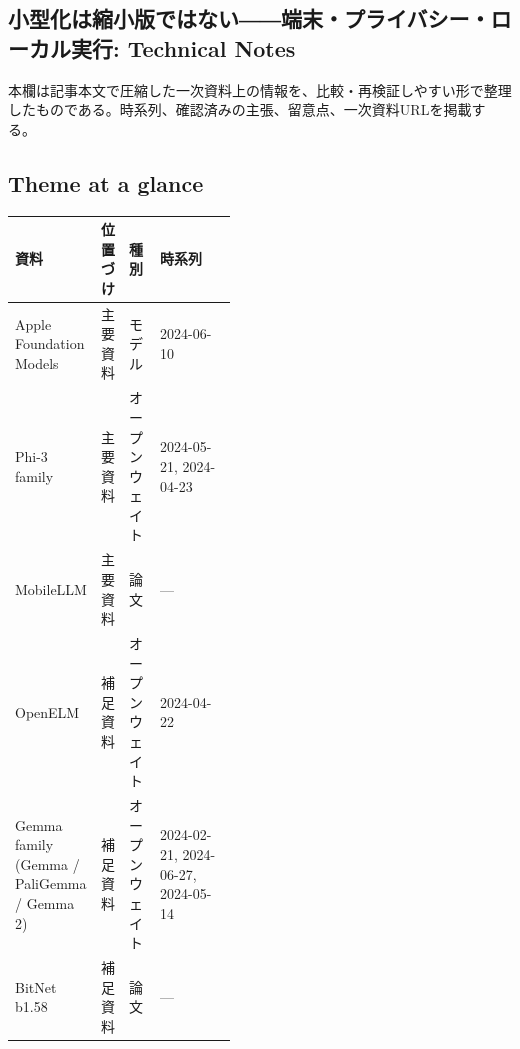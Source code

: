 \subsection*{小型化は縮小版ではない――端末・プライバシー・ローカル実行: Technical Notes}
本欄は記事本文で圧縮した一次資料上の情報を、比較・再検証しやすい形で整理したものである。時系列、確認済みの主張、留意点、一次資料URLを掲載する。
\smallskip
{}\par
\medskip
\subsection*{Theme at a glance}
\begin{center}
\footnotesize
\begin{tabularx}{\linewidth}{@{}p{0.20\linewidth}p{0.10\linewidth}p{0.14\linewidth}X@{}}
\toprule
資料 & 位置づけ & 種別 & 時系列 \\
\midrule
Apple Foundation Models & 主要資料 & モデル & 2024-06-10     \\
Phi-3 family & 主要資料 & オープンウェイト & 2024-05-21, 2024-04-23     \\
MobileLLM & 主要資料 & 論文 & — \\
OpenELM & 補足資料 & オープンウェイト & 2024-04-22     \\
Gemma family (Gemma / PaliGemma / Gemma 2) & 補足資料 & オープンウェイト & 2024-02-21, 2024-06-27, 2024-05-14     \\
BitNet b1.58 & 補足資料 & 論文 & — \\
\bottomrule
\end{tabularx}
\end{center}
\normalsize

